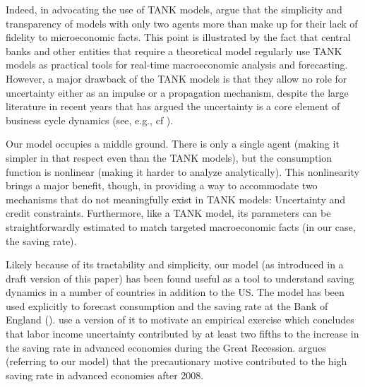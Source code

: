 Indeed, in advocating the use of TANK models, \cite{dgTANK} argue that the simplicity and transparency of models with only two agents more than make up for their lack of fidelity to microeconomic facts.  This point is illustrated by the fact that central banks and other entities that require a theoretical model regularly use TANK models as practical tools for real-time macroeconomic analysis and forecasting. However, a major drawback of the TANK models is that they allow no role for uncertainty either as an impulse or a propagation mechanism, despite the large literature in recent years that has argued the uncertainty is a core element of business cycle dynamics (see, e.g., cf \cite{bfjstUncertain}).

Our  model occupies a middle ground. There is only a single agent (making it simpler in that respect even than the TANK models), but the consumption function is nonlinear (making it harder to analyze analytically).  This nonlinearity brings a major benefit, though, in providing a way to accommodate two mechanisms that do not meaningfully exist in TANK models: Uncertainty and credit constraints.  Furthermore, like a TANK model, its parameters can be straightforwardly estimated to match targeted macroeconomic facts (in our case, the saving rate).

\hypertarget{Our-Model-Has-Been-Used-In-Other-Countries}{}
Likely because of its tractability and simplicity, our model (as introduced in a draft version of this paper) has been found useful as a tool to understand saving dynamics in a number of countries in addition to the US. The model has been used explicitly to forecast consumption and the saving rate at the Bank of England (\cite{BoE_forecasting}).  \cite{modyEtAl_precSaving} use a version of it to motivate an empirical exercise which concludes that labor income uncertainty contributed by at least two fifths to the increase in the saving rate in advanced economies during the Great Recession. \cite{Trichet_JacksonHoleSpeech} argues (referring to our model) that the precautionary motive contributed to the high saving rate in advanced economies after 2008.

\begin{comment} %
  One particularly stringent kind of ``out of sample'' testing of a model is to see whether it is useful in understanding the same issues in countries other than the one whose data the model originally was estimated on.  We have added \href{http://www.econ2.jhu.edu/people/ccarroll/papers/cssUSSaving/#Used-In-Other-Countries}{a paragraph} reporting on the extent to which our model has proven useful to the Bank of England, the ECB, and the IMF in explaining broad developments in in the post-2008 world.
\end{comment}

